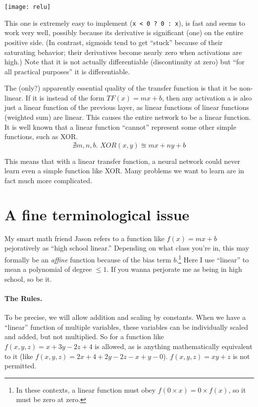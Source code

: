 \documentclass[twocolumn]{article}
\begin{document}
\begin{center}
\texttt{[image: relu]}
\end{center}

This one is extremely easy to implement (\verb+x < 0 ? 0 : x+), is
fast and seems to work very well, possibly because its derivative is
significant (one) on the entire positive side. (In contrast, sigmoids
tend to get ``stuck'' because of their saturating behavior; their
derivatives become nearly zero when activations are high.) Note that
it is not actually differentiable (discontinuity at zero) but ``for
all practical purposes'' it is differentiable.

The (only?) apparently essential quality of the transfer function is
that it be non-linear. If it is instead of the form $T\!F(x) = mx +
b$, then any activation {\sf a} is also just a linear function of the
previous layer, as linear functions of linear functions (weighted sum)
are linear. This causes the entire network to be a linear function. It
is well known that a linear function ``cannot'' represent some other
simple functions, such as XOR.
%
$$\nexists m,n,b.\,\, XOR(x, y) \approxeq m x + n y + b$$

This means that with a linear transfer function, a neural network
could never learn even a simple function like XOR. Many problems we
want to learn are in fact much more complicated.

\section{A fine terminological issue}
My smart math friend Jason refers to a function like $f(x) = mx + b$
pejoratively as ``high school linear.'' Depending on what class you're
in, this may formally be an {\it affine} function because of the bias
term $b$.\footnote{In these contexts, a linear function must obey $f(0 \times x) = 0 \times f(x)$,
so it must be zero at zero.} Here I use ``linear'' to mean a polynomial
of degree $\leq 1$. If you wanna perjorate me as being in high school,
so be it.

\paragraph{The Rules.}
To be precise, we will allow addition and scaling by constants. When
we have a ``linear'' function of multiple variables, these variables
can be individually scaled and added, but not multiplied. So for
a function like $f(x, y, z) = x + 3y - 2z + 4$ is allowed, as is
anything mathematically equivalent to it (like $f(x, y, z) = 2x + 4 + 2y - 2z - x + y - 0$).
$f(x, y, z) = xy + z$ is not permitted.
\end{document}
